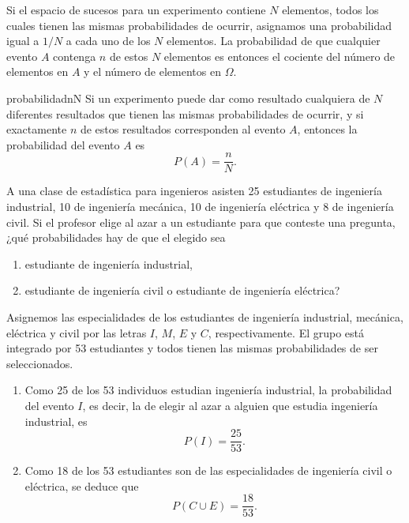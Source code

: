 Si el espacio de sucesos para un experimento contiene $N$ elementos, todos los cuales tienen las mismas probabilidades de ocurrir, asignamos una probabilidad igual a $1/N$ a cada uno de los $N$ elementos. La probabilidad de que cualquier evento $A$ contenga $n$ de estos $N$ elementos es entonces el cociente del número de elementos en $A$ y el número de elementos en $\Omega$.

\begin{definicion}{}{probabilidadnN}
    Si un experimento puede dar como resultado cualquiera de $N$ diferentes resultados que tienen las mismas probabilidades de ocurrir, y si exactamente $n$ de estos resultados corresponden al evento $A$, entonces la probabilidad del evento $A$ es
    $$P(A) = \frac{n}{N}.$$
\end{definicion}

\begin{examplebox}{}{}
    A una clase de estadística para ingenieros asisten 25 estudiantes de ingeniería industrial, 10 de ingeniería mecánica, 10 de ingeniería eléctrica y 8 de ingeniería civil. Si el profesor elige al azar a un estudiante para que conteste una pregunta, ¿qué probabilidades hay de que el elegido sea
    \begin{enumerate}[label=\alph*), topsep=6pt, itemsep=0pt]
        \item estudiante de ingeniería industrial,
        \item estudiante de ingeniería civil o estudiante de ingeniería eléctrica?
    \end{enumerate}
    \tcblower
    \solucion Asignemos las especialidades de los estudiantes de ingeniería industrial, mecánica, eléctrica y civil por las letras $I$, $M$, $E$ y $C$, respectivamente. El grupo está integrado por 53 estudiantes y todos tienen las mismas probabilidades de ser seleccionados.
    \begin{enumerate}[label=\alph*), topsep=6pt, itemsep=0pt]
        \item Como 25 de los 53 individuos estudian ingeniería industrial, la probabilidad del evento $I$, es decir, la de elegir al azar a alguien que estudia ingeniería industrial, es
        $$P(I) = \frac{25}{53}.$$
        \item Como 18 de los 53 estudiantes son de las especialidades de ingeniería civil o eléctrica, se deduce que
        $$P(C \cup E) = \frac{18}{53}.$$
    \end{enumerate}
\end{examplebox}

